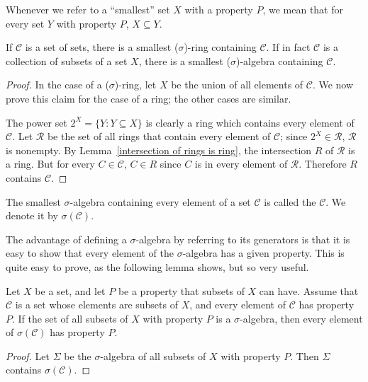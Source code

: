 \begin{subsec}
Whenever we refer to a ``smallest'' set $X$ with a property $P$, we mean that for every set $Y$ with property $P$, $X \subseteq Y$.
\end{subsec}

\begin{lemma}
If $\mathcal C$ is a set of sets, there is a smallest ($\sigma$)-ring containing $\mathcal C$. If in fact $\mathcal C$ is a collection of subsets of a set $X$, there is a smallest ($\sigma$)-algebra containing $\mathcal C$.
\end{lemma}
\begin{proof}
In the case of a ($\sigma$)-ring, let $X$ be the union of all elements of $\mathcal C$.
We now prove this claim for the case of a ring; the other cases are similar.

The power set $2^{X} = \{Y: Y \subseteq X\}$ is clearly a ring which contains every element of $\mathcal C$.
Let $\mathcal R$ be the set of all rings that contain every element of $\mathcal C$; since $2^{X} \in \mathcal R$, $\mathcal R$ is nonempty.
By Lemma~\ref{intersection of rings is ring}, the intersection $R$ of $\mathcal R$ is a ring.
But for every $C \in \mathcal C$, $C \in R$ since $C$ is in every element of $\mathcal R$.
Therefore $R$ contains $\mathcal C$.
\end{proof}

\begin{definition}
The smallest $\sigma$-algebra containing every element of a set $\mathcal C$ is called the  $\mathcal C$.
We denote it by $\sigma(\mathcal C)$.
\end{definition}

\begin{subsec}
The advantage of defining a $\sigma$-algebra by referring to its generators is that it is easy to show that every element of the $\sigma$-algebra has a given property.
This is quite easy to prove, as the following lemma shows, but so very useful.
\end{subsec}

\begin{lemma}\label{generators and relations}
Let $X$ be a set, and let $P$ be a property that subsets of $X$ can have.
Assume that $\mathcal C$ is a set whose elements are subsets of $X$, and every element of $\mathcal C$ has property $P$.
If the set of all subsets of $X$ with property $P$ is a $\sigma$-algebra, then every element of $\sigma(\mathcal C)$ has property $P$.
\end{lemma}
\begin{proof}
Let $\Sigma$ be the $\sigma$-algebra of all subsets of $X$ with property $P$.
Then $\Sigma$ contains $\sigma(\mathcal C)$.
\end{proof}

